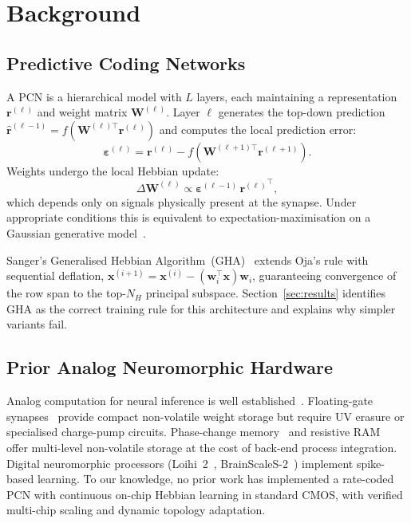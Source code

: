 \documentclass[journal,10pt,twoside]{IEEEtran}
\begin{document}
\section{Background}
\label{sec:background}

\subsection{Predictive Coding Networks}

A PCN is a hierarchical model with $L$ layers, each maintaining a
representation $\mathbf{r}^{(\ell)}$ and weight matrix $\mathbf{W}^{(\ell)}$.
Layer $\ell$ generates the top-down prediction
$\hat{\mathbf{r}}^{(\ell-1)} = f(\mathbf{W}^{(\ell)\top}\mathbf{r}^{(\ell)})$
and computes the local prediction error:
\begin{equation}
\boldsymbol{\varepsilon}^{(\ell)} =
  \mathbf{r}^{(\ell)} - f(\mathbf{W}^{(\ell+1)\top}\mathbf{r}^{(\ell+1)}).
\label{eq:pcn_error}
\end{equation}
Weights undergo the local Hebbian update:
\begin{equation}
\Delta\mathbf{W}^{(\ell)} \propto
  \boldsymbol{\varepsilon}^{(\ell-1)}\,{\mathbf{r}^{(\ell)}}^\top,
\label{eq:pcn_hebb}
\end{equation}
which depends only on signals physically present at the synapse.
Under appropriate conditions this is equivalent to
expectation-maximisation on a Gaussian generative
model~\cite{bogacz2017tutorial}.

Sanger's Generalised Hebbian Algorithm~(GHA)~\cite{Sanger1989} extends
Oja's rule with sequential deflation,
$\mathbf{x}^{(i+1)} = \mathbf{x}^{(i)} - (\mathbf{w}_i^\top\mathbf{x})\mathbf{w}_i$,
guaranteeing convergence of the row span to the top-$N_H$ principal subspace.
Section~\ref{sec:results} identifies GHA as the correct training rule for
this architecture and explains why simpler variants fail.

\subsection{Prior Analog Neuromorphic Hardware}

Analog computation for neural inference is well
established~\cite{shibata1992neuron}.
Floating-gate synapses~\cite{diorio1996single} provide compact non-volatile
weight storage but require UV erasure or specialised charge-pump circuits.
Phase-change memory~\cite{ambrogio2018equivalent} and resistive
RAM~\cite{prezioso2015training} offer multi-level non-volatile storage at
the cost of back-end process integration.
Digital neuromorphic processors (Loihi~2~\cite{davies2018loihi},
BrainScaleS-2~\cite{pfeiffer2018deep}) implement spike-based learning.
To our knowledge, no prior work has implemented a rate-coded PCN with
continuous on-chip Hebbian learning in standard CMOS,
with verified multi-chip scaling and dynamic topology adaptation.
\end{document}
